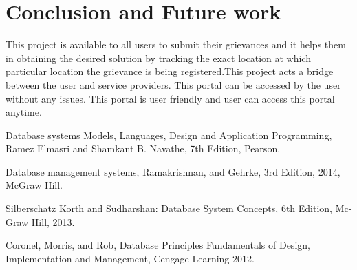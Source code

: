 \documentclass[12pt,a4paper]{report}
\begin{document}
\chapter{Conclusion and Future work}
This project is available to all users to submit their grievances and it helps them in obtaining the desired solution by tracking the exact location at which particular location the grievance is being registered.This project acts a bridge between the user and service providers. This portal can be accessed by the user without any issues. This portal is user friendly and user can access this portal anytime.
\newpage
\pagestyle{plain}
\renewcommand{\bibname}{References}

\begin{thebibliography}{35}
Database systems Models, Languages, Design and Application Programming, Ramez Elmasri and Shamkant B. Navathe, 7th Edition, Pearson.

Database management systems, Ramakrishnan, and Gehrke, 3rd Edition, 2014, McGraw Hill.

Silberschatz Korth and Sudharshan: Database System Concepts, 6th Edition, Mc-Graw Hill, 2013.

Coronel, Morris, and Rob, Database Principles Fundamentals of Design, Implementation and  
Management, Cengage Learning 2012.

\end{thebibliography}
\end{document}
